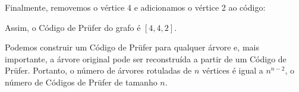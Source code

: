Finalmente, removemos o vértice 4 e adicionamos o vértice 2 ao código:
\begin{center}
\end{center}

Assim, o Código de Prüfer do grafo é $[4,4,2]$.

Podemos construir um Código de Prüfer para qualquer árvore e, mais importante,
a árvore original pode ser reconstruída
a partir de um Código de Prüfer.
Portanto, o número de árvores rotuladas
de $n$ vértices é igual a
$n^{n-2}$, o número de Códigos de Prüfer
de tamanho $n$.
